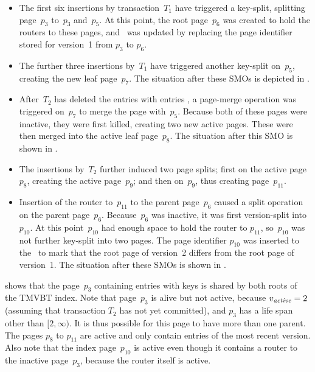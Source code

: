 \begin{itemize}
  \setlength{\itemsep}{0pt}
  \item The first six insertions by transaction~$T_1$ have triggered a
  key-split, splitting page~$p_3$ to~$p_3$ and~$p_5$. 
  At this point, the root page~$p_6$ was created to hold the routers to these
  pages, and \rootstar\ was updated by replacing the page
  identifier stored for version~\num{1} from $p_3$ to $p_6$.
  \item The further three insertions by~$T_1$ have triggered another
  key-split on~$p_5$, creating the new leaf page~$p_7$. 
  The situation after these SMOs is depicted in .
  \item After~$T_2$ has deleted the entries with entries , a 
  page-merge operation was triggered on~$p_7$ to merge the page with~$p_5$. 
  Because both of these pages were inactive, they were first killed, creating
  two new active pages. 
  These were then merged into the active leaf page~$p_8$.
  The situation after this SMO is shown in .
  \item The insertions by~$T_2$ further induced two page splits; first on the
  active page~$p_8$, creating the active page~$p_9$; and then on~$p_9$,
  thus creating page~$p_{11}$.
  \item Insertion of the router to~$p_{11}$ to the parent page~$p_6$ caused a
  split operation on the parent page~$p_6$. 
  Because~$p_6$ was inactive, it was first version-split into~$p_{10}$.
  At this point~$p_{10}$ had enough space to hold the router to $p_{11}$,
  so~$p_{10}$ was not further key-split into two pages.
  The page identifier $p_{10}$ was inserted to the \rootstar\ to mark that the
  root page of version~\num{2} differs from the root page of version~\num{1}.
  The situation after these SMOs is shown in .
\end{itemize}

 shows that the page~$p_3$ containing entries
with keys  is shared by both roots of the TMVBT index. 
Note that page~$p_3$ is alive but not active, because $\smash{v_{\text{\textit{active}}}} = 2$ 
(assuming that transaction $T_2$ has not yet committed), and $p_3$ has a
life span other than $[2, \infty)$.
It is thus possible for this page to have more than one parent. 
The pages $p_8$ to $p_{11}$ are active and only contain entries of
the most recent version. 
Also note that the index page~$p_{10}$ is active even though it contains a
router to the inactive page~$p_3$, because the router itself is active.



